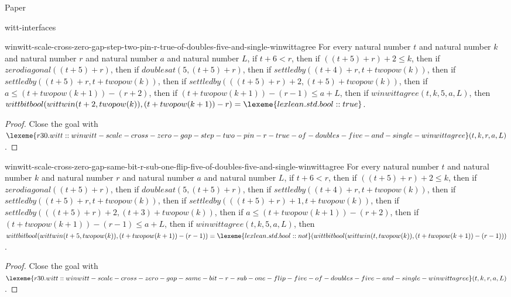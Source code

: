\begin{lexlean}{Paper}
\begin{section}{witt-interfaces}
  \begin{theorem}{winwitt-scale-cross-zero-gap-step-two-pin-r-true-of-doubles-five-and-single-winwittagree}
  For every natural number \(t\) and natural number \(k\) and natural number \(r\) and natural number \(a\) and natural number \(L\), if \(t + 6 < r\), then if \(((t + 5) + r) + 2 ≤ k\), then if \(zerodiagonal((t + 5) + r)\), then if \(doublesat(5, (t + 5) + r)\), then if \(settledby((t + 4) + r, t + twopow(k))\), then if \(settledby((t + 5) + r, t + twopow(k))\), then if \(settledby(((t + 5) + r) + 2, (t + 5) + twopow(k))\), then if \(a ≤ (t + twopow(k + 1)) - (r + 2)\), then if \((t + twopow(k + 1)) - (r - 1) ≤ a + L\), then if \(winwittagree(t, k, 5, a, L)\), then \(wittbitbool(wittwin(t + 2, twopow(k)), (t + twopow(k + 1)) - r) = \lexeme{lexlean.std.bool::true}\).
  \begin{proof}
  Close the goal with \(\lexeme{r30.witt::winwitt-scale-cross-zero-gap-step-two-pin-r-true-of-doubles-five-and-single-winwittagree}(t, k, r, a, L)\).
  \end{proof}
  \end{theorem}

  \begin{theorem}{winwitt-scale-cross-zero-gap-same-bit-r-sub-one-flip-five-of-doubles-five-and-single-winwittagree}
  For every natural number \(t\) and natural number \(k\) and natural number \(r\) and natural number \(a\) and natural number \(L\), if \(t + 6 < r\), then if \(((t + 5) + r) + 2 ≤ k\), then if \(zerodiagonal((t + 5) + r)\), then if \(doublesat(5, (t + 5) + r)\), then if \(settledby((t + 4) + r, t + twopow(k))\), then if \(settledby((t + 5) + r, t + twopow(k))\), then if \(settledby(((t + 5) + r) + 1, t + twopow(k))\), then if \(settledby(((t + 5) + r) + 2, (t + 3) + twopow(k))\), then if \(a ≤ (t + twopow(k + 1)) - (r + 2)\), then if \((t + twopow(k + 1)) - (r - 1) ≤ a + L\), then if \(winwittagree(t, k, 5, a, L)\), then \(wittbitbool(wittwin(t + 5, twopow(k)), (t + twopow(k + 1)) - (r - 1)) = \lexeme{lexlean.std.bool::not}(wittbitbool(wittwin(t, twopow(k)), (t + twopow(k + 1)) - (r - 1)))\).
  \begin{proof}
  Close the goal with \(\lexeme{r30.witt::winwitt-scale-cross-zero-gap-same-bit-r-sub-one-flip-five-of-doubles-five-and-single-winwittagree}(t, k, r, a, L)\).
  \end{proof}
  \end{theorem}


\end{section}
\end{lexlean}
